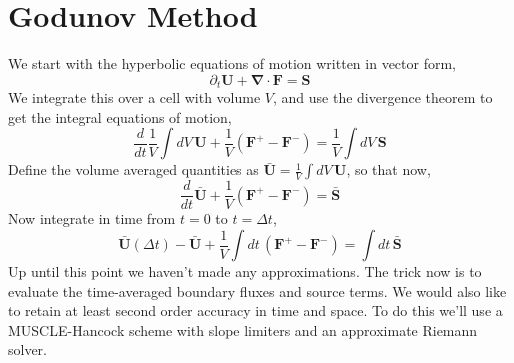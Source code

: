 \documentclass{article}
\begin{document}
\section{Godunov Method}
We start with the hyperbolic equations of motion written in vector form,
\begin{equation}
    \partial_t \mathbf{U} + \mathbf{\nabla} \cdot \mathbf{F} = \mathbf{S}
\end{equation}
We integrate this over a cell with volume $V$, and use the divergence theorem to get the integral equations of motion,
\begin{equation}
    \frac{d }{d t} \frac{1}{V} \int dV \, \mathbf{U} + \frac{1}{V} \left( \mathbf{F}^+ - \mathbf{F}^- \right)= \frac{1}{V} \int dV \, \mathbf{S} 
\end{equation}
Define the volume averaged quantities as $\bar{\mathbf{U}} = \frac{1}{V} \int dV \, \mathbf{U}$, so that now,
\begin{equation}
    \frac{d }{d t} \bar{\mathbf{U}} + \frac{1}{V} \left( \mathbf{F}^+ - \mathbf{F}^- \right) = \bar{\mathbf{S}} 
\end{equation}
Now integrate in time from $t=0$ to $t=\Delta t$,
\begin{equation}
    \bar{\mathbf{U}}(\Delta t) - \bar{\mathbf{U}} + \frac{1}{V} \int dt \, \left( \mathbf{F}^+ - \mathbf{F}^- \right) = \int dt \, \bar{\mathbf{S}} 
\end{equation}
Up until this point we haven't made any approximations. The trick now is to evaluate the time-averaged boundary fluxes and source terms. We would also like to retain at least second order accuracy in time and space. To do this we'll use a MUSCLE-Hancock scheme with slope limiters and an approximate Riemann solver. 
\end{document}

